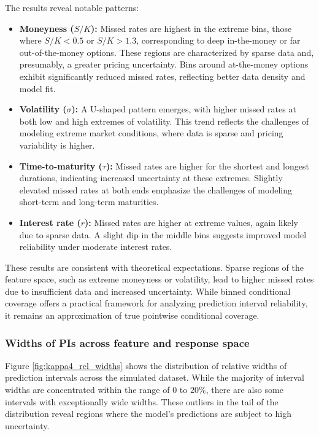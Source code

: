 \documentclass{article}
\theoremstyle{definition}
\begin{document}
The results reveal notable patterns:
\begin{itemize}
    \item \textbf{Moneyness ($S/K$):} Missed rates are highest in the extreme bins, those where $S/K < 0.5$ or $S/K > 1.3$, corresponding to deep in-the-money or far out-of-the-money options. These regions are characterized by sparse data and, presumably, a greater pricing uncertainty. Bins around at-the-money options exhibit significantly reduced missed rates, reflecting better data density and model fit.
    \item \textbf{Volatility ($\sigma$):} A U-shaped pattern emerges, with higher missed rates at both low and high extremes of volatility. This trend reflects the challenges of modeling extreme market conditions, where data is sparse and pricing variability is higher.
    \item \textbf{Time-to-maturity ($\tau$):} Missed rates are higher for the shortest and longest durations, indicating increased uncertainty at these extremes. Slightly elevated missed rates at both ends emphasize the challenges of modeling short-term and long-term maturities.
    \item \textbf{Interest rate ($r$):} Missed rates are higher at extreme values, again likely due to sparse data. A slight dip in the middle bins suggests improved model reliability under moderate interest rates.
\end{itemize}

These results are consistent with theoretical expectations. Sparse regions of the feature space, such as extreme moneyness or volatility, lead to higher missed rates due to insufficient data and increased uncertainty. While binned conditional coverage offers a practical framework for analyzing prediction interval reliability, it remains an approximation of true pointwise conditional coverage.

\subsubsection{Widths of PIs across feature and response space}

Figure \ref{fig:kappa4_rel_widths} shows the distribution of relative widths of prediction intervals across the simulated dataset. While the majority of interval widths are concentrated within the range of $0$ to $20\%$, there are also some intervals with exceptionally wide widths. These outliers in the tail of the distribution reveal regions where the model's predictions are subject to high uncertainty.
\end{document}
